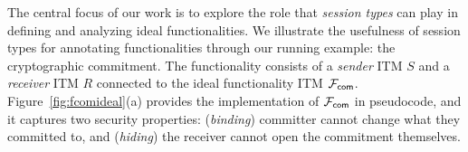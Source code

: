
The central focus of our work is to explore the role that \emph{session types} can play in defining and analyzing ideal functionalities.
We illustrate the usefulness of session types for annotating functionalities through our running example: the cryptographic commitment.
The functionality consists of a \emph{sender} ITM $S$ and a \emph{receiver} ITM $R$ connected to 
the ideal functionality ITM $\mathcal{F}_{{\mathsf {com}}}$.
Figure~\ref{fig:fcomideal}(a) provides the implementation of $\mathcal{F}_{{\mathsf {com}}}$ in pseudocode, and 
it captures two security properties: (\emph{binding}) committer cannot change what they committed to, and (\emph{hiding}) the receiver cannot
open the commitment themselves. 

